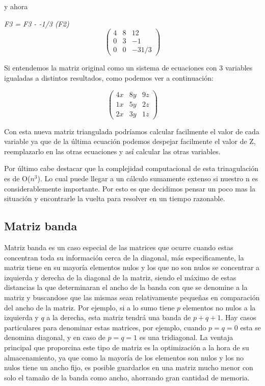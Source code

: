 y ahora

\emph{F3 = F3 - -1/3 (F2) } 
\[ \left( \begin{array}{ccc}
4 & 8 & 12 \\
0 & 3 & -1 \\
0 & 0 & -31/3 \end{array} \right)\] 

Si entendemos la matriz original como un sistema de ecuaciones con 3 variables igualadas a distintos resultados, como podemos ver a continuación:

\[ \left( \begin{array}{ccc}
4x & 8y & 9z \\
1x & 5y & 2z \\
2x & 3y & 1z \end{array} \right)\] 

Con esta nueva matriz triangulada podríamos calcular facilmente el valor de cada variable ya que de la última ecuación podemos despejar facilmente el valor de Z, reemplazarlo en las otras ecuaciones y así calcular las otras variables.



Por último cabe destacar que la complejidad computacional de esta trinagulación es de O($n^3$). Lo cual puede llegar a un cálculo sumamente extenso si nuestro n es considerablemente importante. Por esto es que decidimos pensar un poco mas la situación y encontrarle la vuelta para resolver en un tiempo razonable.

\subsection{Matriz banda}

Matriz banda es un caso especial de las matrices que ocurre cuando estas concentran toda su información cerca de la diagonal, más especificamente, la matriz tiene en su mayoría elementos nulos y los que no son nulos se concentrar a izquierda y derecha de la diagonal de la matriz, siendo el máximo de estas distancias la que determinaran el ancho de la banda con que se denomine a la matriz y buscandose que las mismas sean relativamente pequeñas en comparación del ancho de la matriz. Por ejemplo, si a lo sumo tiene $p$ elementos no nulos a la izquierda y $q$ a la derecha, esta matriz tendrá una banda de $p+q+1$. Hay casos particulares para denominar estas matrices, por ejemplo, cuando $p = q = 0$ esta se denomina diagonal, y en caso de $p = q = 1$  es una tridiagonal.
La ventaja principal que proporcina este tipo de matriz es la optimización a la hora de su almacenamiento, ya que como la mayoría de los elementos son nulos y los no nulos tiene un ancho fijo, es posible guardarlos en una matriz mucho menor con solo el tamaño de la banda como ancho, ahorrando gran cantidad de memoria.

